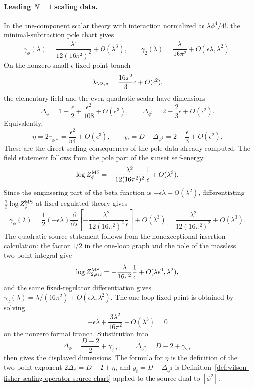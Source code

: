 \paragraph{Leading \(N=1\) scaling data.}
In the one-component scalar theory with interaction normalized as
\(\lambda\phi^4/4!\), the minimal-subtraction pole chart gives
\[
  \gamma_\phi(\lambda)
  =
  \frac{\lambda^2}{12(16\pi^2)^2}+O(\lambda^3),
  \qquad
  \gamma_2(\lambda)
  =
  \frac{\lambda}{16\pi^2}
  +O(\epsilon\lambda,\lambda^2).
\]
On the nonzero small-\(\epsilon\) fixed-point branch
\[
  \lambda_{{\rm MS},*}
  =
  \frac{16\pi^2}{3}\epsilon+O(\epsilon^2),
\]
the elementary field and the even quadratic scalar have dimensions
\[
  \Delta_\phi
  =
  1-\frac{\epsilon}{2}
  +\frac{\epsilon^2}{108}
  +O(\epsilon^3),
  \qquad
  \Delta_{\phi^2}
  =
  2-\frac{2}{3}\epsilon+O(\epsilon^2).
\]
Equivalently,
\[
  \eta=2\gamma_{\phi*}
  =
  \frac{\epsilon^2}{54}+O(\epsilon^3),
  \qquad
  y_t=D-\Delta_{\phi^2}
  =
  2-\frac{\epsilon}{3}+O(\epsilon^2).
\]
These are the direct scaling consequences of the pole data already computed.
The field statement follows from the pole part of the sunset self-energy:
\[
  \log Z_\phi^{\rm MS}
  =
  -\frac{\lambda^2}{12(16\pi^2)^2}\frac1\epsilon
  +O(\lambda^3).
\]
Since the engineering part of the beta function is
\(-\epsilon\lambda+O(\lambda^2)\), differentiating
\(\frac12\log Z_\phi^{\rm MS}\) at fixed regulated theory gives
\[
  \gamma_\phi(\lambda)
  =
  \frac12\left(-\epsilon\lambda\right)
  \frac{\partial}{\partial\lambda}
  \left[
    -\frac{\lambda^2}{12(16\pi^2)^2}\frac1\epsilon
  \right]
  +O(\lambda^3)
  =
  \frac{\lambda^2}{12(16\pi^2)^2}+O(\lambda^3).
\]
The quadratic-source statement follows from the nonexceptional insertion
calculation: the factor \(1/2\) in the one-loop graph and the pole of the
massless two-point integral give
\[
  \log Z_{2,\rm src}^{\rm MS}
  =
  -\frac{\lambda}{16\pi^2}\frac1\epsilon
  +O(\lambda\epsilon^0,\lambda^2),
\]
and the same fixed-regulator differentiation gives
\(\gamma_2(\lambda)=\lambda/(16\pi^2)+O(\epsilon\lambda,\lambda^2)\).
The one-loop fixed point is obtained by solving
\[
  -\epsilon\lambda+\frac{3\lambda^2}{16\pi^2}+O(\lambda^3)=0
\]
on the nonzero formal branch.  Substitution into
\[
  \Delta_\phi=\frac{D-2}{2}+\gamma_{\phi*},
  \qquad
  \Delta_{\phi^2}=D-2+\gamma_{2*}
\]
then gives the displayed dimensions.  The formula for \(\eta\) is the
definition of the two-point exponent
\(2\Delta_\phi=D-2+\eta\), and \(y_t=D-\Delta_{\phi^2}\) is
Definition~\ref{def:wilson-fisher-scaling-operator-source-chart} applied to
the source dual to \([\phi^2]\).

